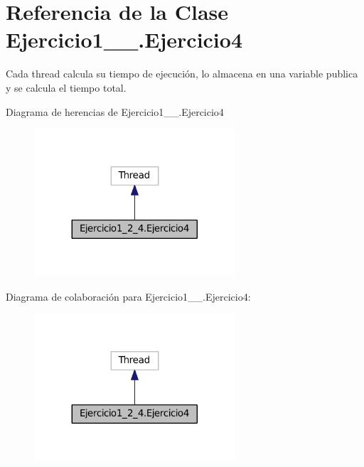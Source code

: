 \hypertarget{class_ejercicio1__2__4_1_1_ejercicio4}{}\section{Referencia de la Clase Ejercicio1\+\_\+\_.\+Ejercicio4}
\label{class_ejercicio1__2__4_1_1_ejercicio4}


Cada thread calcula su tiempo de ejecución, lo almacena en una variable publica y se calcula el tiempo total.  




Diagrama de herencias de Ejercicio1\+\_\+\_.\+Ejercicio4
\nopagebreak
\begin{figure}[H]
\begin{center}
\leavevmode
\includegraphics[width=212pt]{class_ejercicio1__2__4_1_1_ejercicio4__inherit__graph}
\end{center}
\end{figure}


Diagrama de colaboración para Ejercicio1\+\_\+\_.\+Ejercicio4\+:
\nopagebreak
\begin{figure}[H]
\begin{center}
\leavevmode
\includegraphics[width=212pt]{class_ejercicio1__2__4_1_1_ejercicio4__coll__graph}
\end{center}
\end{figure}
